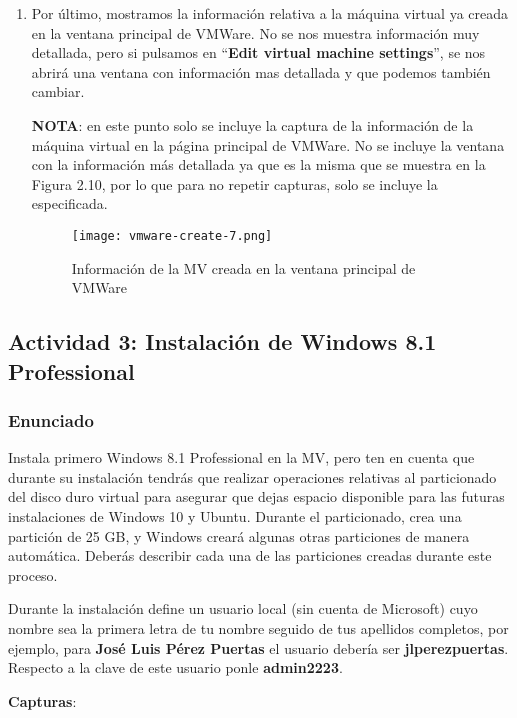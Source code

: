 \begin{enumerate}
    \item Por último, mostramos la información relativa a la máquina virtual ya creada en la ventana principal de VMWare. No se nos muestra información muy detallada, pero si pulsamos en ``\textbf{Edit virtual machine settings}'', se nos abrirá una ventana con información mas detallada y que podemos también cambiar.

    \textbf{NOTA}: en este punto solo se incluye la captura de la información de la máquina virtual en la página principal de VMWare. No se incluye la ventana con la información más detallada ya que es la misma que se muestra en la Figura 2.10, por lo que para no repetir capturas, solo se incluye la especificada.

    \begin{figure}[H]
        \centering
        \texttt{[image: vmware-create-7.png]}
        \caption{Información de la MV creada en la ventana principal de VMWare}
    \end{figure}
\end{enumerate}

\subsection{Actividad 3: Instalación de Windows 8.1 Professional}

\subsubsection{Enunciado}
Instala primero Windows 8.1 Professional en la MV, pero ten en cuenta que durante su instalación tendrás que realizar operaciones relativas al particionado del disco duro virtual para asegurar que dejas espacio disponible para las futuras instalaciones de Windows 10 y Ubuntu. Durante el particionado, crea una partición de 25 GB, y Windows creará algunas otras particiones de manera automática. Deberás describir cada una de las particiones creadas durante este proceso.

Durante la instalación define un usuario local (sin cuenta de Microsoft) cuyo nombre sea la primera letra de tu nombre seguido de tus apellidos completos, por ejemplo, para \textbf{José Luis Pérez Puertas} el usuario debería ser \textbf{\textbf{jlperezpuertas}}. Respecto a la clave de este usuario ponle \textbf{admin2223}.

\textbf{Capturas}:


